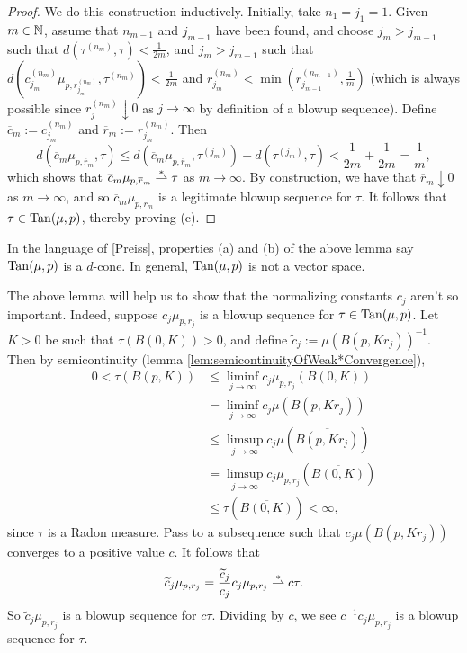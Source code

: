 \begin{proof}
    We do this construction inductively. Initially, take $n_1 = j_1 = 1$. Given $m \in \mathbb{N}$, assume that $n_{m-1}$ and $j_{m-1}$ have been found, and choose $j_m > j_{m-1}$ such that $d(\tau^{(n_m)},\tau) < \frac{1}{2m}$, and $j_m > j_{m-1}$ such that $d(c_{j_m}^{(n_m)}\mu_{p,r_{j_m}^{(n_m)}},\tau^{(n_m)}) < \frac{1}{2m}$ and $r_{j_m}^{(n_m)} < \min\left( r_{j_{m-1}}^{(n_{m-1})},\frac{1}{m} \right)$ (which is always possible since $r_j^{(n_m)} \downarrow 0$ as $j \to \infty$ by definition of a blowup sequence). Define $\overline{c}_m := c^{(n_m)}_{j_m}$ and $\overline{r}_m := r^{(n_m)}_{j_m}$. Then 
    \begin{equation}
        d(\overline{c}_m \mu_{p,\overline{r}_m}, \tau) \leq d(\overline{c}_m \mu_{p,\overline{r}_m}, \tau^{(j_m)}) + d(\tau^{(j_m)},\tau)
                                                          < \frac{1}{2m} + \frac{1}{2m}
                                                          = \frac{1}{m},
    \end{equation}
    which shows that $\overline{c}_m \mu_{p,\overline{r}_m} \overset{\ast}{\rightharpoonup} \tau$ as $m \to \infty$. By construction, we have that $\overline{r}_m \downarrow 0$ as $m \to \infty$, and so $\overline{c}_m \mu_{p,\overline{r}_m}$ is a legitimate blowup sequence for $\tau$. It follows that $\tau \in \operatorname{Tan}(\mu,p)$, thereby proving (c).
\end{proof}
In the language of [Preiss], properties (a) and (b) of the above lemma say $\operatorname{Tan}(\mu,p)$ is a $d$-cone. In general, $\operatorname{Tan}(\mu,p)$ is not a vector space.

The above lemma will help us to show that the normalizing constants $c_j$ aren't so important. Indeed, suppose $c_j \mu_{p,r_j}$ is a blowup sequence for $\tau \in \operatorname{Tan}(\mu,p)$. Let $K > 0$ be such that $\tau(B(0,K)) > 0$, and define $\widetilde{c}_j := \mu(B(p,Kr_j))^{-1}$. Then by semicontinuity (lemma \ref{lem:semicontinuityOfWeak*Convergence}),
\begin{equation} \begin{aligned}
    0 < \tau(B(p,K)) &\leq \liminf_{j \to \infty} c_j \mu_{p,r_j}(B(0,K)) \\
                     &= \liminf_{j \to \infty} c_j \mu(B(p,Kr_j)) \\
                     &\leq \limsup_{j \to \infty} c_j \mu(\overline{B(p,Kr_j)}) \\
                     &= \limsup_{j \to \infty} c_j \mu_{p,r_j}(\overline{B(0,K)}) \\
                     &\leq \tau(\overline{B(0,K)}) < \infty,
\end{aligned} \end{equation}
since $\tau$ is a Radon measure. Pass to a subsequence such that $c_j\mu(B(p,Kr_j))$ converges to a positive value $c$. It follows that 
\begin{equation}
    \widetilde{c}_j \mu_{p,r_j} = \frac{\widetilde{c}_j}{c_j} c_j \mu_{p,r_j} \overset{\ast}{\rightharpoonup} c \tau.
\end{equation}
So $\widetilde{c}_j \mu_{p,r_j}$ is a blowup sequence for $c \tau$. Dividing by $c$, we see $c^{-1}c_j \mu_{p,r_j}$ is a blowup sequence for $\tau$.

